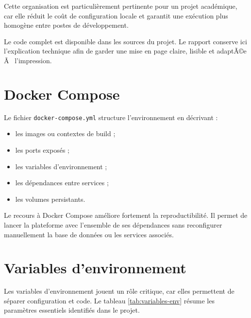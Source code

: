 ﻿\documentclass[12pt,a4paper,oneside]{report}
\newenvironment{codeblock}[1][]{
  \par
  \captionsetup{type=figure}
}{
  \par
}
\begin{document}
Cette organisation est particulièrement pertinente pour un projet académique, car elle réduit le coût de configuration locale et garantit une exécution plus homogène entre postes de développement.

\begin{codeblock}[H]
\caption{Fichier \texttt{docker-compose.yml} du projet}
\begin{keybox}
Le code complet est disponible dans les sources du projet. Le rapport conserve ici l'explication technique afin de garder une mise en page claire, lisible et adaptÃ©e Ã  l'impression.
\end{keybox}
\end{codeblock}

\section{Docker Compose}
Le fichier \texttt{docker-compose.yml} structure l'environnement en décrivant :
\begin{itemize}
  \item les images ou contextes de build ;
  \item les ports exposés ;
  \item les variables d'environnement ;
  \item les dépendances entre services ;
  \item les volumes persistants.
\end{itemize}

Le recours à Docker Compose améliore fortement la reproductibilité. Il permet de lancer la plateforme avec l'ensemble de ses dépendances sans reconfigurer manuellement la base de données ou les services associés.

\section{Variables d'environnement}
Les variables d'environnement jouent un rôle critique, car elles permettent de séparer configuration et code. Le tableau \ref{tab:variables-env} résume les paramètres essentiels identifiés dans le projet.
\end{document}
